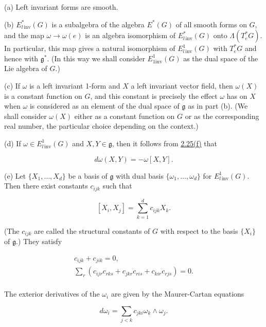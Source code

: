 \begin{proposition}\label{thm:3.12}
(a) Left invariant forms are smooth.

(b) $E^{*}_{l\,\mathrm{inv}}(G)$ is a subalgebra of the algebra $E^{*}(G)$ of all smooth forms on $G$, and the map $\omega \to \omega(e)$ is an algebra isomorphism of $E^{*}_{l\,\mathrm{inv}}(G)$ onto $\Lambda(T_{e}^{*} G)$. In particular, this map gives a natural isomorphism of $E^{1}_{l\,\mathrm{inv}}(G)$ with $T_{e}^{*} G$ and hence with $\mathfrak{g}^*$. (In this way we shall consider $E^1_{1\mathrm{inv}}(G)$ as the dual space of the Lie algebra of $G$.)

(c) If $\omega$ is a left invariant 1-form and $X$ a left invariant vector field, then $\omega(X)$ is a constant function on $G$, and this constant is precisely the effect $\omega$ has on $X$ when $\omega$ is considered as an element of the dual space of $\mathfrak{g}$ as in part (b). (We shall consider $\omega(X)$ either as a constant function on $G$ or as the corresponding real number, the particular choice depending on the context.)

(d) If  $ \omega \in E_{l\,\mathrm{inv}}^{1}(G) $ and  $ X, Y \in \mathfrak{g} $, then it follows from \hyperref[thm:2.25]{2.25(f)} that

\begin{equation}
\tag{1}\label{eq:3.12:1}
d\omega(X,Y)=-\omega[X,Y].
\end{equation}

(e) Let $\{X_{1}, \ldots, X_{d}\}$ be a basis of $\mathfrak{g}$ with dual basis $\{\omega_{1}, \ldots, \omega_{d}\}$ for $E_{l\,\mathrm{inv}}^{1}(G)$. Then there exist constants $c_{ijk}$ such that

\begin{equation}
\tag{2}\label{eq:3.12:2}
[X_{i},X_{j}]=\sum_{k=1}^{d}c_{i j k}X_{k}.
\end{equation}

(The $c_{ijk}$ are called the structural constants of $G$ with respect to the basis $\{X_{i}\}$ of $\mathfrak{g}$.) They satisfy

\begin{equation}
\tag{3}\label{eq:3.12:3}
\begin{array}{c}{c_{i j k}+c_{j i k}=0,}\\ {\sum_{r}(c_{i j r}c_{r k s}+c_{j k r}c_{r i s}+c_{k i r}c_{r j s})=0.}\\ \end{array}
\end{equation}

The exterior derivatives of the $\omega_{i}$ are given by the Maurer-Cartan equations

\begin{equation}
\tag{4}\label{eq:3.12:4}
d\omega_{i}=\sum_{j<k}c_{j k i}\omega_{k}\wedge\omega_{j}.
\end{equation}

\end{proposition}

